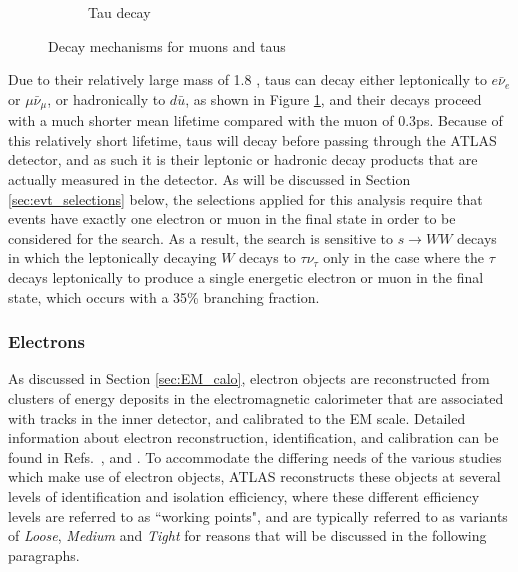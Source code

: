 \begin{figure}[hp]
\begin{subfigure}[t]{0.49\textwidth}
%
%				
%				
%
	\caption{Tau decay}
	\label{fig:tau_decay}
	\end{subfigure}
	\caption{Decay mechanisms for muons and taus}
	\label{fig:lepton_decays}
\end{figure}

Due to their relatively large mass of 1.8 \GeV, taus can decay either leptonically to \(e\bar{\nu}_e\) or \(\mu\bar{\nu}_\mu\), or hadronically to \(d\bar{u}\), as shown in Figure \ref{fig:tau_decay}, and their decays proceed with a much shorter mean lifetime compared with the muon of 0.3ps. Because of this relatively short lifetime, taus will decay before passing through the ATLAS detector, and as such it is their leptonic or hadronic decay products that are actually measured in the detector. As will be discussed in Section \ref{sec:evt_selections} below, the selections applied for this analysis require that events have exactly one electron or muon in the final state in order to be considered for the search. As a result, the search is sensitive to \(s\rightarrow WW\) decays in which the leptonically decaying \(W\) decays to \(\tau\nu_\tau\) only in the case where the \(\tau\) decays leptonically to produce a single energetic electron or muon in the final state, which occurs with a 35\% branching fraction.

\subsubsection{Electrons}

As discussed in Section \ref{sec:EM_calo}, electron objects are reconstructed from clusters of energy deposits in the electromagnetic calorimeter that are associated with tracks in the inner detector, and calibrated to the EM scale. Detailed information about electron reconstruction, identification, and calibration can be found in Refs.~\cite{ATL-PHYS-PUB-2017-022}, \cite{PERF-2017-01} and \cite{PERF-2017-03}. To accommodate the differing needs of the various studies which make use of electron objects, ATLAS reconstructs these objects at several levels of identification and isolation efficiency, where these different efficiency levels are referred to as ``working points", and are typically referred to as variants of \emph{Loose}, \emph{Medium} and \emph{Tight} for reasons that will be discussed in the following paragraphs.

